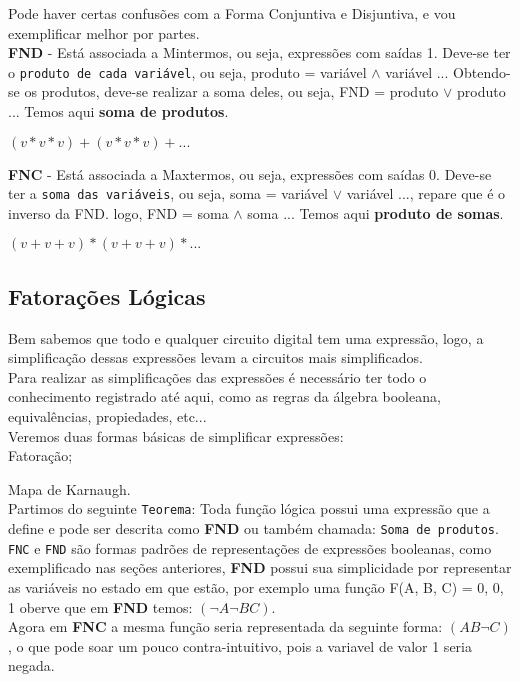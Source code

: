 \documentclass[12pt, onecolumn]{article}
\begin{document}
	Pode haver certas confusões com a Forma Conjuntiva e Disjuntiva, 
	e vou exemplificar melhor por partes. \\
	\newline
	\textbf{FND} - Está associada a Mintermos, ou seja, expressões com saídas 1.
	Deve-se ter o \texttt{produto de cada variável}, ou seja, 
	produto =  variável $\land$ variável ...
	Obtendo-se os produtos, deve-se realizar a soma deles, ou seja,
	FND =  produto $\lor$ produto ... Temos aqui \textbf{soma de produtos}. \\
	\begin{center}
		$(v * v * v) + (v * v * v) + ... $
	\end{center}
	\textbf{FNC} - Está associada a Maxtermos, ou seja, expressões com saídas 0.
	Deve-se ter a \texttt{soma das variáveis}, ou seja,
	soma = variável $\lor$ variável ..., repare que é o inverso da FND.
	logo, FND = soma $\land$ soma ... Temos aqui \textbf{produto de somas}. \\
	\begin{center}
		$(v + v + v) * (v + v + v) * ... $
	\end{center}
	
		\subsection{\centering Fatorações Lógicas}
	
	Bem sabemos que todo e qualquer circuito digital tem uma expressão, logo, 
	a simplificação dessas expressões levam a circuitos mais simplificados. \\
	\newline
	Para realizar as simplificações das expressões é necessário ter todo o
	conhecimento registrado até aqui, como as regras da álgebra booleana, 
	equivalências, propiedades, etc... \\
	\newline
	Veremos duas formas básicas de simplificar expressões: \\
		
		Fatoração;
		
		Mapa de Karnaugh. \\
	\newline	
	Partimos do seguinte \texttt{Teorema}: Toda função lógica possui uma expressão
	que a define e pode ser descrita como \textbf{FND} ou também chamada: 
	\texttt{Soma de produtos}. \\
	\newline
	\texttt{FNC} e \texttt{FND} são formas padrões de representações de expressões
	booleanas, como exemplificado nas seções anteriores, \textbf{FND} possui
	sua simplicidade por representar as variáveis no estado em que estão, 
	por exemplo uma função F(A, B, C) = 0, 0, 1 oberve que	em \textbf{FND} 
	temos:	$(\lnot{A} \lnot{B} C)$. \\
	\newline
	Agora em \textbf{FNC} a mesma função seria representada	da seguinte 
	forma: $(A B \lnot{C})$, o que pode soar um pouco contra-intuitivo,
	pois a variavel de valor 1 seria negada.
		
\end{document}
